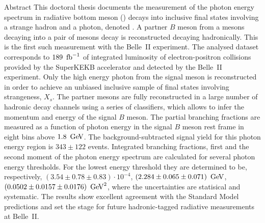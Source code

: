 \begin{abstractpage}{Abstract}
    This doctoral thesis documents the measurement of the photon energy spectrum in radiative bottom meson (\B) decays 
    into inclusive final states involving a strange hadron and a photon, denoted \BtoXsgamma. 
    A partner $B$ meson from a \FourS mesons decaying into a pair of \B mesons decay is reconstructed decaying hadronically.
    This is the first such measurement with the Belle~II experiment.
    The analysed dataset corresponds to $189~\mbox{\,fb}^{-1}$ of integrated luminosity of electron-positron collisions provided by the SuperKEKB accelerator and detected by the Belle~II experiment.
    Only the high energy photon from the signal \B meson is reconstructed in order to achieve an unbiased inclusive sample of final states involving strangeness, $X_s$.
    The partner \B mesons are fully reconstructed in a large number of hadronic decay channels using a series of classifiers,
    which allows to infer the momentum and energy of the signal $B$ meson.
    The \BtoXsgamma partial branching fractions are measured as a function of photon energy 
    in the signal $B$ meson rest frame in eight bins above $1.8~\mathrm{\,Ge\kern -0.1em V}$.
    The background-subtracted signal yield for this photon energy region is $343 \pm 122$ events. 
    Integrated branching fractions, first and the second moment of the photon energy spectrum are calculated for several photon energy thresholds.
    For the lowest energy threshold they are determined to be, respectively, 
    $(3.54 \pm 0.78 \pm 0.83)\cdot10^{-4}$,
    $(2.284 \pm 0.065 \pm 0.071)~\mathrm{\,Ge\kern -0.1em V}$,
    $(0.0502 \pm 0.0157 \pm 0.0176)~\mathrm{\,Ge\kern -0.1em V}^2$,
    where the uncertainties are statisical and systematic.
    The results show excellent agreement with the Standard Model predictions and set the stage for future hadronic-tagged radiative measurements at Belle~II.
    \end{abstractpage}
